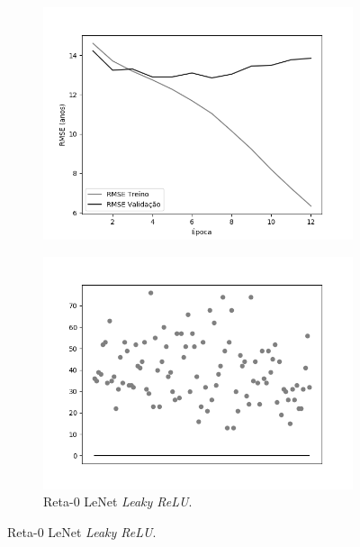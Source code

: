 \begin{figure}[h!]
\begin{subfigure}[hb]{0.5\linewidth}
	    \includegraphics[width=\linewidth]{img/graficos/history/lenet/fig-history-image-treat-1-lenet-lrelu-rmse.png}
	  \end{subfigure}
		\begin{subfigure}[hb]{0.5\linewidth}
			\caption{Reta-0 LeNet \emph{Leaky ReLU}.}

		 \includegraphics[width=\linewidth]{img/graficos/reta0/lenet/fig-reta-0-image-treat-1-lenet-lrelu.png}
		\end{subfigure}%
	\end{figure}


